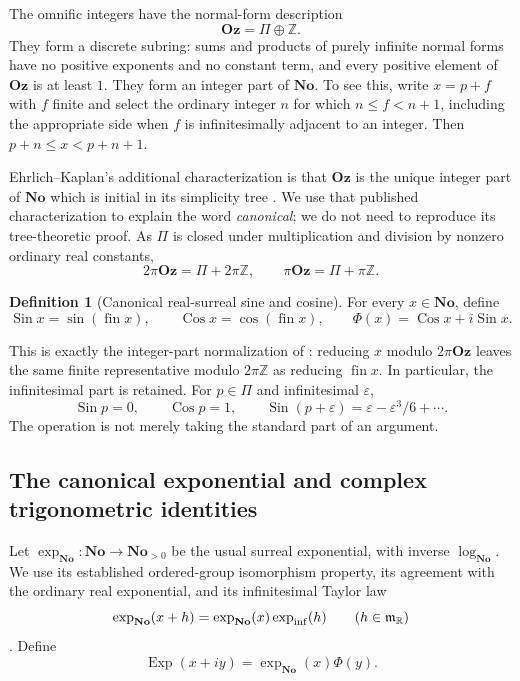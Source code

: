 \documentclass[11pt,letterpaper]{article}
\theoremstyle{definition}
\newtheorem{definition}[theorem]{Definition}
\theoremstyle{remark}
\newcommand{\No}{\mathbf{No}}
\newcommand{\Oz}{\mathbf{Oz}}
\newcommand{\R}{\mathbb R}\newcommand{\C}{\mathbb C}
\newcommand{\Z}{\mathbb Z}\newcommand{\N}{\mathbb N}
\newcommand{\fin}{\operatorname{fin}}
\newcommand{\Sin}{\operatorname{Sin}}
\newcommand{\Cos}{\operatorname{Cos}}
\newcommand{\Exp}{\operatorname{Exp}}
\newcommand{\expi}{\operatorname{exp}_{\mathrm{inf}}}
\numberwithin{equation}{section}
\begin{document}
The omnific integers have the normal-form description
\begin{equation}\label{eq:omnific}
 \Oz=\Pi\oplus\Z.
\end{equation}
They form a discrete subring: sums and products of purely infinite normal forms have no positive exponents and no constant term, and every positive element of $\Oz$ is at least $1$. They form an integer part of $\No$. To see this, write $x=p+f$ with $f$ finite and select the ordinary integer $n$ for which $n\le f<n+1$, including the appropriate side when $f$ is infinitesimally adjacent to an integer. Then $p+n\le x<p+n+1$.

Ehrlich--Kaplan's additional characterization is that $\Oz$ is the unique integer part of $\No$ which is initial in its simplicity tree \cite[Lemma 11.1]{EK}. We use that published characterization to explain the word \emph{canonical}; we do not need to reproduce its tree-theoretic proof. As $\Pi$ is closed under multiplication and division by nonzero ordinary real constants,
\begin{equation}\label{eq:periodclass}
 2\pi\Oz=\Pi+2\pi\Z,\qquad \pi\Oz=\Pi+\pi\Z.
\end{equation}

\begin{definition}[Canonical real-surreal sine and cosine]\label{def:globaltrig}
For every $x\in\No$, define
\[
 \Sin x=\sin(\fin x),\qquad \Cos x=\cos(\fin x),\qquad
 \Phi(x)=\Cos x+i\Sin x.
\]
\end{definition}
This is exactly the integer-part normalization of \cite[\S11]{EK}: reducing $x$ modulo $2\pi\Oz$ leaves the same finite representative modulo $2\pi\Z$ as reducing $\fin x$. In particular, the infinitesimal part is retained. For $p\in\Pi$ and infinitesimal $\varepsilon$,
\[
 \Sin p=0,\qquad \Cos p=1,\qquad
 \Sin(p+\varepsilon)=\varepsilon-\varepsilon^3/6+\cdots.
\]
The operation is not merely taking the standard part of an argument.

\subsection{The canonical exponential and complex trigonometric identities}
Let $\exp_{\No}:\No\to\No_{>0}$ be the usual surreal exponential, with inverse $\log_{\No}$. We use its established ordered-group isomorphism property, its agreement with the ordinary real exponential, and its infinitesimal Taylor law
\[
 \exp_{\No}(x+h)=\exp_{\No}(x)\expi(h)\qquad(h\in\mm_{\R})
\]
\cite{Gonshor,vdDE}. Define
\begin{equation}\label{eq:globalexp}
 \Exp(x+iy)=\exp_{\No}(x)\Phi(y).
\end{equation}
\end{document}
